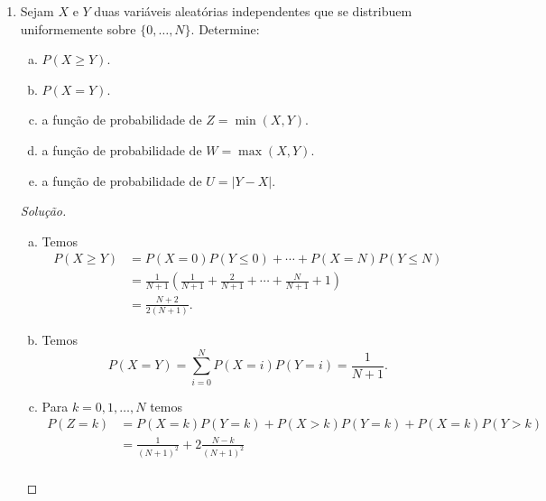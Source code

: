 \documentclass[../Notas.tex]{subfiles}
\begin{document}
\begin{enumerate}
\begin{proof}[Solução]
        \begin{enumerate}[a)]
            \item Temos $(X_1, \dots, X_r) \sim \text{Multinomial}(2r, p_1, \dots, p_r)$, com
            $p_i = 1/r$, $i=1,2,\dots,r$.
            \item Temos
            \[
            P(X_1 = 2, \dots, X_r = 2) = \binom{2r}{2,2,\dots,2}\cdot\frac{1}{r^2}\cdots\frac{1}{r^2}
                                       = \frac{(2r)!}{2^r\cdot r^{2r}}.
            \]
        \end{enumerate}
    \end{proof}
    \item Sejam $X$ e $Y$ duas variáveis aleatórias independentes que se distribuem uniformemente sobre $\{0, \dots, N\}$. Determine:
    \begin{enumerate}[a)]
    \item $P(X\geq Y)$.
    \item $P(X=Y)$.
    \item a função de probabilidade de $Z = \min(X,Y)$.
    \item a função de probabilidade de $W = \max(X,Y)$.
    \item a função de probabilidade de $U = |Y-X|$.
    \end{enumerate}
    \begin{proof}[Solução]
        \begin{enumerate}[a)]
            \item Temos
            \begin{align*}
                P(X\geq Y) &= P(X=0)P(Y\leq 0) + \cdots + P(X=N)P(Y\leq N) \\
                           &= \frac{1}{N+1}\left( \frac{1}{N+1} + \frac{2}{N+1} 
                           + \cdots + \frac{N}{N+1} + 1 \right) \\
                           &= \frac{N+2}{2(N+1)}.
            \end{align*}
            \item Temos
            \[
            P(X=Y) = \sum_{i=0}^N P(X=i)P(Y=i) = \frac{1}{N+1}.
            \]
            \item Para $k=0,1,\dots,N$ temos
            \begin{align*}
                P(Z=k) &= P(X=k)P(Y=k) + P(X>k)P(Y=k) + P(X=k)P(Y>k) \\
                       &= \frac{1}{(N+1)^2} + 2\frac{N-k}{(N+1)^2} \\

\end{align*}
\end{enumerate}
\end{proof}
\end{enumerate}
\end{document}
